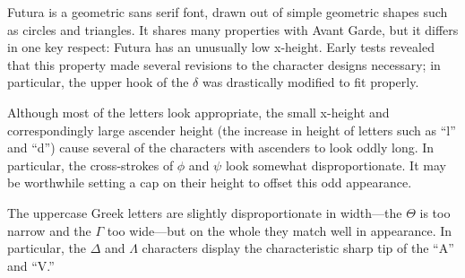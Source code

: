 
Futura is a geometric sans serif font, drawn out of simple geometric shapes such
as circles and triangles. It shares many properties with Avant Garde, but it
differs in one key respect: Futura has an unusually low x-height. Early tests
revealed that this property made several revisions to the character designs
necessary; in particular, the upper hook of the $\delta$ was drastically
modified to fit properly.

Although most of the letters look appropriate, the small x-height and
correspondingly large ascender height (the increase in height of letters such as
``l'' and ``d'') cause several of the characters with ascenders to look oddly
long. In particular, the cross-strokes of $\phi$ and $\psi$ look somewhat
disproportionate. It may be worthwhile setting a cap on their height to offset
this odd appearance.

The uppercase Greek letters are slightly disproportionate in width---the
$\Theta$ is too narrow and the $\Gamma$ too wide---but on the whole they match
well in appearance. In particular, the $\Delta$ and $\Lambda$ characters display
the characteristic sharp tip of the ``A'' and ``V.''

